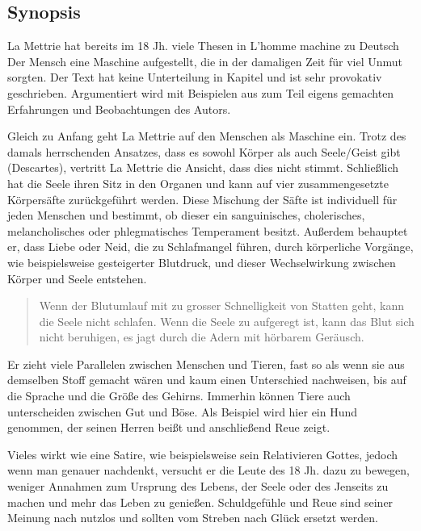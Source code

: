 \documentclass[twoside, a4paper, DIV=11, open=any, bibliography=totoc]{scrbook}
\newcommand{\Quote}[1]{\glqq #1\grqq{}}
\begin{document}
\subsection{Synopsis} \label{sec:litsynops2}
La Mettrie hat bereits im 18 Jh. viele Thesen in \Quote{L'homme machine} zu Deutsch \Quote{Der Mensch eine Maschine} aufgestellt, die in der damaligen Zeit für viel Unmut sorgten. Der Text hat keine Unterteilung in Kapitel und ist sehr provokativ geschrieben. Argumentiert wird mit Beispielen aus zum Teil eigens gemachten Erfahrungen und Beobachtungen des Autors.  
\par
Gleich zu Anfang geht La Mettrie auf den Menschen als Maschine ein. Trotz des damals herrschenden Ansatzes, dass es sowohl Körper als auch Seele/Geist gibt (Descartes), vertritt La Mettrie die Ansicht, dass dies nicht stimmt. Schließlich hat die Seele ihren Sitz in den Organen und kann auf vier zusammengesetzte Körpersäfte zurückgeführt werden. Diese Mischung der Säfte ist individuell für jeden Menschen und bestimmt, ob dieser ein sanguinisches, cholerisches, melancholisches oder phlegmatisches Temperament besitzt. Außerdem behauptet er, dass Liebe oder Neid, die zu Schlafmangel führen, durch körperliche Vorgänge, wie beispielsweise gesteigerter Blutdruck, und dieser Wechselwirkung zwischen Körper und Seele entstehen.  

\begin{quote}
   \Quote{Wenn der Blutumlauf mit zu grosser Schnelligkeit von Statten geht, kann die Seele nicht schlafen. Wenn die Seele zu aufgeregt ist, kann das Blut sich nicht beruhigen, es jagt durch die Adern mit hörbarem Geräusch.}
\end{quote}

\par
Er zieht viele Parallelen zwischen Menschen und Tieren, fast so als wenn sie aus demselben Stoff gemacht wären und kaum einen Unterschied nachweisen, bis auf die Sprache und die Größe des Gehirns. Immerhin können Tiere auch unterscheiden zwischen \Quote{Gut} und \Quote{Böse}. Als Beispiel wird hier ein Hund genommen, der seinen Herren beißt und anschließend Reue zeigt.  
\par
Vieles wirkt wie eine Satire, wie beispielsweise sein Relativieren Gottes, jedoch wenn man genauer nachdenkt, versucht er die Leute des 18 Jh. dazu zu bewegen, weniger Annahmen zum Ursprung des Lebens, der Seele oder des Jenseits zu machen und mehr das Leben zu genießen. Schuldgefühle und Reue sind seiner Meinung nach nutzlos und sollten vom Streben nach Glück ersetzt werden.  
\end{document}
